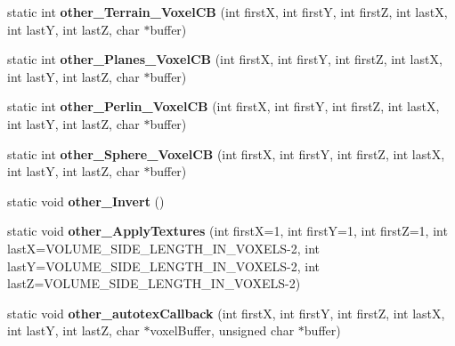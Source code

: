 \begin{DoxyCompactItemize}
\item 
\hypertarget{classLevel_ae5b82cc5a68b06d00501b504359ef94b}{
static int {\bfseries other\-\_\-\-Terrain\-\_\-\-Voxel\-C\-B} (int first\-X, int first\-Y, int first\-Z, int last\-X, int last\-Y, int last\-Z, char $\ast$buffer)}
\label{d2/d9d/classLevel_ae5b82cc5a68b06d00501b504359ef94b}

\item 
\hypertarget{classLevel_aae7d7a58e0d1e50df97af6692e0e7064}{
static int {\bfseries other\-\_\-\-Planes\-\_\-\-Voxel\-C\-B} (int first\-X, int first\-Y, int first\-Z, int last\-X, int last\-Y, int last\-Z, char $\ast$buffer)}
\label{d2/d9d/classLevel_aae7d7a58e0d1e50df97af6692e0e7064}

\item 
\hypertarget{classLevel_a4cacc1a6f1655a3598d2f7704016aedf}{
static int {\bfseries other\-\_\-\-Perlin\-\_\-\-Voxel\-C\-B} (int first\-X, int first\-Y, int first\-Z, int last\-X, int last\-Y, int last\-Z, char $\ast$buffer)}
\label{d2/d9d/classLevel_a4cacc1a6f1655a3598d2f7704016aedf}

\item 
\hypertarget{classLevel_ae28e10fcf944707f4076b081fc30d7da}{
static int {\bfseries other\-\_\-\-Sphere\-\_\-\-Voxel\-C\-B} (int first\-X, int first\-Y, int first\-Z, int last\-X, int last\-Y, int last\-Z, char $\ast$buffer)}
\label{d2/d9d/classLevel_ae28e10fcf944707f4076b081fc30d7da}

\item 
\hypertarget{classLevel_aa34fbddfab8ce6434f9186f4f8306b3c}{
static void {\bfseries other\-\_\-\-Invert} ()}
\label{d2/d9d/classLevel_aa34fbddfab8ce6434f9186f4f8306b3c}

\item 
\hypertarget{classLevel_a5f1df80a628306a984d90b120986cc2f}{
static void {\bfseries other\-\_\-\-Apply\-Textures} (int first\-X=1, int first\-Y=1, int first\-Z=1, int last\-X=\-V\-O\-L\-U\-M\-E\-\_\-\-S\-I\-D\-E\-\_\-\-L\-E\-N\-G\-T\-H\-\_\-\-I\-N\-\_\-\-V\-O\-X\-E\-L\-S-\/2, int last\-Y=\-V\-O\-L\-U\-M\-E\-\_\-\-S\-I\-D\-E\-\_\-\-L\-E\-N\-G\-T\-H\-\_\-\-I\-N\-\_\-\-V\-O\-X\-E\-L\-S-\/2, int last\-Z=\-V\-O\-L\-U\-M\-E\-\_\-\-S\-I\-D\-E\-\_\-\-L\-E\-N\-G\-T\-H\-\_\-\-I\-N\-\_\-\-V\-O\-X\-E\-L\-S-\/2)}
\label{d2/d9d/classLevel_a5f1df80a628306a984d90b120986cc2f}

\item 
\hypertarget{classLevel_a1641140e1a51ad4e34cc2915e89d6728}{
static void {\bfseries other\-\_\-autotex\-Callback} (int first\-X, int first\-Y, int first\-Z, int last\-X, int last\-Y, int last\-Z, char $\ast$voxel\-Buffer, unsigned char $\ast$buffer)}
\label{d2/d9d/classLevel_a1641140e1a51ad4e34cc2915e89d6728}

\end{DoxyCompactItemize}
